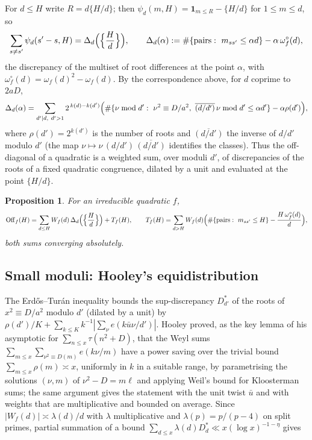 \documentclass[11pt,a4paper]{article}
\newtheorem{proposition}[theorem]{Proposition}
\newcommand{\Off}{\mathrm{Off}}
\begin{document}
For $d\le H$ write $R=d\{H/d\}$; then $\psi_d(m,H)=\mathbf 1_{m\le R}-\{H/d\}$ for $1\le m\le d$, so
\begin{equation}\label{eq:disc}
\sum_{s\ne s'}\psi_d(s'-s,H)=\Delta_d\Bigl(\Bigl\{\frac Hd\Bigr\}\Bigr),\qquad
\Delta_d(\alpha):=\#\{\text{pairs}:\ m_{ss'}\le\alpha d\}-\alpha\,\omega^\circ_f(d),
\end{equation}
the discrepancy of the multiset of root differences at the point $\alpha$, with
$\omega^\circ_f(d)=\omega_f(d)^2-\omega_f(d)$. By the correspondence above, for $d$ coprime to $2aD$,
\[
\Delta_d(\alpha)=\sum_{d'\mid d,\ d'>1}2^{\,k(d)-k(d')}\Bigl(\#\{\nu\bmod d':\ \nu^2\equiv D/a^2,\ \overline{(d/d')}\,\nu\bmod d'\le\alpha d'\}-\alpha\rho(d')\Bigr),
\]
where $\rho(d')=2^{k(d')}$ is the number of roots and $\overline{(d/d')}$ the inverse of $d/d'$ modulo $d'$
(the map $\nu\mapsto\nu\,(d/d')\,\overline{(d/d')}$ identifies the classes). Thus the off-diagonal of a
quadratic is a weighted sum, over moduli $d'$, of discrepancies of the roots of a fixed quadratic
congruence, dilated by a unit and evaluated at the point $\{H/d\}$.

\begin{proposition}\label{prop:A1}
For an irreducible quadratic $f$,
\[
\Off_f(H)=\sum_{d\le H}W_f(d)\,\Delta_d\Bigl(\Bigl\{\frac Hd\Bigr\}\Bigr)+T_f(H),\qquad
T_f(H)=\sum_{d>H}W_f(d)\Bigl(\#\{\text{pairs}:\ m_{ss'}\le H\}-\frac{H\,\omega^\circ_f(d)}d\Bigr),
\]
both sums converging absolutely.
\end{proposition}

\subsection{Small moduli: Hooley's equidistribution}

The Erd\H os--Tur\'an inequality bounds the sup-discrepancy $D^\ast_{d'}$ of the roots of $x^2\equiv D/a^2$
modulo $d'$ (dilated by a unit) by $\rho(d')/K+\sum_{k\le K}k^{-1}|\sum_\nu e(k\bar u\nu/d')|$. Hooley
\cite{Hooley1963} proved, as the key lemma of his asymptotic for $\sum_{n\le x}\tau(n^2+D)$, that the Weyl
sums $\sum_{m\le x}\sum_{\nu^2\equiv D(m)}e(k\nu/m)$ have a power saving over the trivial bound
$\sum_{m\le x}\rho(m)\asymp x$, uniformly in $k$ in a suitable range, by parametrising the solutions
$(\nu,m)$ of $\nu^2-D=m\ell$ and applying Weil's bound for Kloosterman sums; the same argument gives the
statement with the unit twist $\bar u$ and with weights that are multiplicative and bounded on average.
Since $|W_f(d)|\asymp\lambda(d)/d$ with $\lambda$ multiplicative and $\lambda(p)=p/(p-4)$ on split primes,
partial summation of a bound $\sum_{d\le x}\lambda(d)D^\ast_d\ll x(\log x)^{-1-\eta}$ gives
\end{document}
